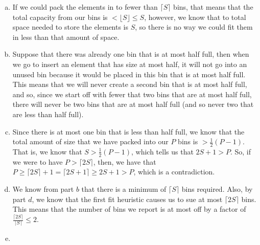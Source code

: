 \documentclass{article}
\begin{document}
\begin{enumerate}[a.]
\begin{comment}
Let $\epsilon$ be a number less than $\frac{1}{tn}$. Let $x_i' = x_i /t$ and $x_1'' = x_1' + \epsilon$. Then, we consider the instances of the bin packing problem in which we have $1/x_1'$ instances of the elements $x_i'$. We also consider the instance of the bin packing problem in which we have $1/x_1'$ instances of $\{x_1'', x_2',\ldots,x_n'\}$. If these two values for the bin packing differ, then we must have that $x_1'$ was in a bin that added up to exactly $1$ in the first instance, which means that there was a solution to the original subset sum problem containing the first element. If they are the same then that means that whatever bin that $x_1'$ ended up in the first instance, it was summing up to some value less than one, so was not part of a solution to the subset sum problem.
\end{comment}
\item
If we could pack the elements in to fewer than $\lceil S \rceil$ bins, that means that the total capacity from our bins is $< \lfloor S \rfloor \le S$, however, we know that to total space needed to store the elements is $S$, so there is no way we could fit them in less than that amount of space. 
\item
Suppose that there was already one bin that is at most half full, then when we go to insert an element that has size at most half, it will not go into an unused bin because it would be placed in this bin that is at most half full. This means that we will never create a second bin that is at most half full, and so, since we start off with fewer that two bins that are at most half full, there will never be two bins that are at most half full (and so never two that are less than half full).
\item
Since there is at most one bin that is less than half full, we know that the total amount of size that we have packed into our $P$ bins is $> \frac{1}{2}(P-1)$. That is, we know that $S > \frac{1}{2} (P-1)$, which tells us that $2S+1 > P$. So, if we were to have $P>\lceil 2S \rceil$, then, we have that $P \ge \lceil 2S\rceil +1 = \lceil 2S +1 \rceil \ge 2S+1 > P$, which is a contradiction.
\item
We know from part $b$ that there is a minimum of $\lceil S\rceil$ bins required. Also, by part $d$, we know that the first fit heuristic causes us to sue at most $\lceil 2S\rceil$ bins. This means that the number of bins we report is at most off by a factor of $\frac{\lceil 2S\rceil}{\lceil S \rceil} \le 2$.
\item

\end{enumerate}
\end{document}
